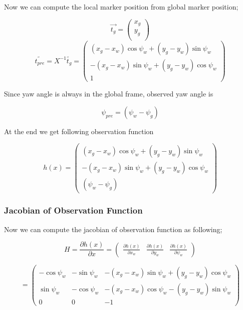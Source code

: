 \documentclass[14pt,a4paper]{article}
\begin{document}
		
		Now we can compute the local marker position from global marker position;
		
		\[\vec{t_{g}}= \left( \begin{array}{c}
						x_{g} \\ y_{g}\\ 
				\end{array} \right)\] 	
		$$
			\tilde{t_{pre}}  = X^{-1} \tilde{t_{g}}
			= \begin{pmatrix}
					(x_{g} - x_{w})\cos\psi_{w}	 +	(y_{g}-y_{w})\sin\psi_{w}\\ 	
					-(x_{g} - x_{w})\sin\psi_{w} +	(y_{g}-y_{w})\cos\psi_{w}\\
												1
				\end{pmatrix}
		$$
		
		Since yaw angle is always in the global frame, observed yaw angle is
		
		\[ \psi_{pre}=(\psi_{w} - \psi_{g})\]
		
		At the end we get following observation function
		
		$$
		h(x)	= \begin{pmatrix}
					(x_{g} - x_{w})\cos\psi_{w}	 +	(y_{g}-y_{w})\sin\psi_{w}\\ 	
					-(x_{g} - x_{w})\sin\psi_{w} +	(y_{g}-y_{w})\cos\psi_{w}\\
											(\psi_{w} - \psi_{g})
			\end{pmatrix}
		$$
		
		\subsubsection{Jacobian of Observation Function}
		
			Now we can  compute the jacobian of observation function as following;
		
		$$
			H = \frac{\partial h(x)}{\partial x}
			  = \begin{pmatrix}
			  \frac{\partial h(x)}{\partial x_{w}} &
			  \frac{\partial h(x)}{\partial y_{w}} &
			  \frac{\partial h(x)}{\partial \psi_{w}}  			
			  \end{pmatrix}
		$$
		
		$$
			  = 
			  \begin{pmatrix}
					-\cos\psi_{w} & -\sin\psi_{w} & -(x_{g} - x_{w})\sin\psi_{w} +	(y_{g}-y_{w})\cos\psi_{w}\\  	
					\sin\psi_{w}  &	-\cos\psi_{w} & -(x_{g	} - x_{w})\cos\psi_{w} -	(y_{g}-y_{w})\sin\psi_{w}\\
											0 & 0 & -1
			\end{pmatrix}
		$$
\end{document}
